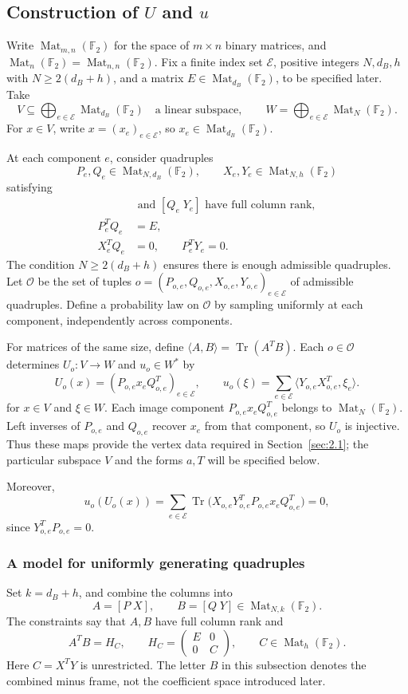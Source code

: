 \documentclass[11pt]{article}
\begin{document}
\subsection{Construction of $U$ and $u$}\label{sec:frames}
Write $\operatorname{Mat}_{m,n}(\mathbb F_2)$ for the space of $m\times n$ binary matrices, and $\operatorname{Mat}_n(\mathbb F_2)=\operatorname{Mat}_{n,n}(\mathbb F_2)$. Fix a finite index set $\mathcal E$, positive integers $N,d_B,h$ with $N\ge2(d_B+h)$, and a matrix $E\in\operatorname{Mat}_{d_B}(\mathbb F_2)$, to be specified later. Take
\[
V\subseteq\bigoplus_{e\in\mathcal E}\operatorname{Mat}_{d_B}(\mathbb F_2)
\quad\text{a linear subspace},\qquad
W=\bigoplus_{e\in\mathcal E}\operatorname{Mat}_N(\mathbb F_2).
\]
For $x\in V$, write $x=(x_e)_{e\in\mathcal E}$, so $x_e\in\operatorname{Mat}_{d_B}(\mathbb F_2)$.

At each component $e$, consider quadruples
\[
P_e,Q_e\in\operatorname{Mat}_{N,d_B}(\mathbb F_2),\qquad
X_e,Y_e\in\operatorname{Mat}_{N,h}(\mathbb F_2)
\]
satisfying
\begin{align*}
	[P_e\;X_e]&\text{ and }[Q_e\;Y_e]\text{ have full column rank},\\
	P_e^TQ_e&=E,\\
	X_e^TQ_e&=0,\qquad P_e^TY_e=0.
\end{align*}
The condition $N\ge2(d_B+h)$ ensures there is enough admissible quadruples. Let $\mathcal{O}$ be the set of tuples $o=(P_{o,e},Q_{o,e},X_{o,e},Y_{o,e})_{e\in\mathcal E}$ of admissible quadruples. Define a probability law on $\mathcal{O}$ by sampling uniformly at each component, independently across components. 

For matrices of the same size, define $\langle A,B\rangle=\operatorname{Tr}(A^TB)$. Each $o\in\mathcal O$ determines $U_o:V\to W$ and $u_o\in W^*$ by
\[
U_o(x)=(P_{o,e}x_eQ_{o,e}^T)_{e\in\mathcal E},\qquad
u_o(\xi)=\sum_{e\in\mathcal E}\langle Y_{o,e}X_{o,e}^T,\xi_e\rangle.
\]
for $x\in V$ and $\xi\in W$. Each image component $P_{o,e}x_eQ_{o,e}^T$ belongs to $\operatorname{Mat}_N(\mathbb F_2)$. Left inverses of $P_{o,e}$ and $Q_{o,e}$ recover $x_e$ from that component, so $U_o$ is injective. Thus these maps provide the vertex data required in Section~\ref{sec:2.1}; the particular subspace $V$ and the forms $a,T$ will be specified below.

Moreover,
\[
u_o(U_o(x))=\sum_{e\in\mathcal E}
\operatorname{Tr}\bigl(X_{o,e}Y_{o,e}^TP_{o,e}x_eQ_{o,e}^T\bigr)=0,
\]
since $Y_{o,e}^TP_{o,e}=0$.
\subsubsection{A model for uniformly generating quadruples} 
Set $k=d_B+h$, and combine the columns into
\[
A=[P\;X],\qquad B=[Q\;Y]\in\operatorname{Mat}_{N,k}(\mathbb F_2).
\]
The constraints say that $A,B$ have full column rank and
\[
A^TB=H_C,\qquad
H_C=\begin{pmatrix}E&0\\0&C\end{pmatrix},\qquad
C\in\operatorname{Mat}_h(\mathbb F_2).
\]
Here $C=X^TY$ is unrestricted. The letter $B$ in this subsection denotes the combined minus frame, not the coefficient space introduced later.
\end{document}
